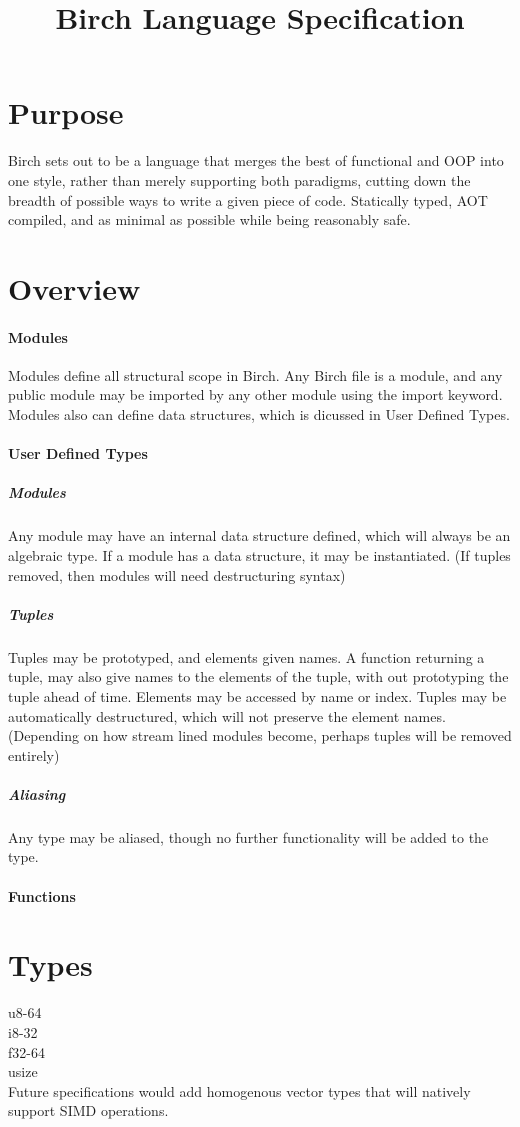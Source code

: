 \documentclass{article}
\title{Birch Language Specification}
\begin{document}
	\maketitle
	\newpage
	\section{Purpose}
		Birch sets out to be a language that merges the best of functional and OOP into one style,
		rather than merely supporting both paradigms,
		cutting down the breadth of possible ways to write a given piece of code.
		Statically typed, AOT compiled, and as minimal as possible while being reasonably safe.
	\section{Overview}
		\paragraph{Modules}
			Modules define all structural scope in Birch. 
			Any Birch file is a module, and any public module may be imported by any other module using the import keyword.
			Modules also can define data structures, which is dicussed in User Defined Types.
		\paragraph{User Defined Types}
			\subparagraph{Modules}
				Any module may have an internal data structure defined, which will always be an algebraic type.
				If a module has a data structure, it may be instantiated.
				(If tuples removed, then modules will need destructuring syntax)
			\subparagraph{Tuples}
				Tuples may be prototyped, and elements given names. 
				A function returning a tuple, may also give names to the elements of the tuple, with out prototyping the tuple ahead of time.
				Elements may be accessed by name or index.
				Tuples may be automatically destructured, which will not preserve the element names.
				(Depending on how stream lined modules become, perhaps tuples will be removed entirely)
			\subparagraph{Aliasing}
				Any type may be aliased, though no further functionality will be added to the type.
		\paragraph{Functions}
	\section{Types}	
		u8-64\\
		i8-32\\
		f32-64\\
		usize\\ 
		Future specifications would add homogenous vector types that will natively support SIMD operations.
\end{document}
